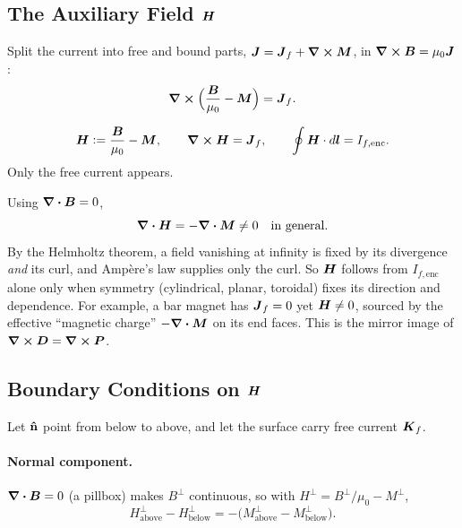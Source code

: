 \subsection{The Auxiliary Field \texorpdfstring{$\vect{H}$}{H}}

Split the current into free and bound parts, $\vect{J} = \vect{J}_f + \curl\vect{M}$, in $\curl\vect{B} = \mu_0\vect{J}$:
\[
    \curl\Bigl(\frac{\vect{B}}{\mu_0} - \vect{M}\Bigr) = \vect{J}_f .
\]

\begin{definition}
\[
    \vect{H} \defeq \frac{\vect{B}}{\mu_0} - \vect{M},
    \qquad
    \curl\vect{H} = \vect{J}_f,
    \qquad
    \oint\vect{H}\cdot d\lvect{l} = I_{f,\text{enc}} .
\]
Only the free current appears.
\end{definition}

\begin{fact}
Using $\div\vect{B} = 0$,
\[
    \div\vect{H} = -\div\vect{M}\neq0\quad\text{in general}.
\]
By the Helmholtz theorem, a field vanishing at infinity is fixed by its divergence \emph{and} its curl, and Amp\`ere's law supplies only the curl. So $\vect{H}$ follows from $I_{f,\text{enc}}$ alone only when symmetry (cylindrical, planar, toroidal) fixes its direction and dependence. For example, a bar magnet has $\vect{J}_f = 0$ yet $\vect{H}\neq0$, sourced by the effective ``magnetic charge'' $-\div\vect{M}$ on its end faces. This is the mirror image of $\curl\vect{D} = \curl\vect{P}$.
\end{fact}

\subsection{Boundary Conditions on \texorpdfstring{$\vect{H}$}{H}}

Let $\boldsymbol{\hat{\textbf{n}}}$ point from below to above, and let the surface carry free current $\vect{K}_f$.

\paragraph{Normal component.} $\div\vect{B} = 0$ (a pillbox) makes $B^\perp$ continuous, so with $H^\perp = B^\perp/\mu_0 - M^\perp$,
\[
    H^\perp_{\text{above}} - H^\perp_{\text{below}} = -\bigl(M^\perp_{\text{above}} - M^\perp_{\text{below}}\bigr).
\]

